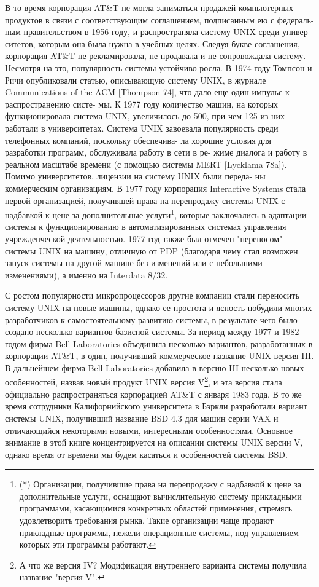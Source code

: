     В то время корпорация AT\&T не  могла  заниматься  продажей  компьютерных
продуктов  в связи с соответствующим соглашением, подписанным ею с федераль-
ным правительством в 1956 году, и распространяла систему UNIX среди  универ-
ситетов,  которым  она  была нужна в учебных целях. Следуя букве соглашения,
корпорация AT\&T не рекламировала, не продавала и  не  сопровождала  систему.
Несмотря на это, популярность системы устойчиво росла. В 1974 году Томпсон и
Ричи опубликовали статью, описывающую систему UNIX, в журнале Communications
of the ACM [Thompson 74], что дало еще один импульс к распространению систе-
мы.  К  1977 году количество машин, на которых функционировала система UNIX,
увеличилось до 500, при чем 125 из них  работали  в  университетах.  Система
UNIX завоевала популярность среди телефонных компаний, поскольку обеспечива-
ла  хорошие условия для разработки программ, обслуживала работу в сети в ре-
жиме диалога и работу в реальном масштабе времени (с  помощью  системы  MERT
[Lycklama 78a]). Помимо университетов, лицензии на систему UNIX были переда-
ны  коммерческим  организациям.  В  1977 году корпорация Interactive Systems
стала первой организацией, получившей права на перепродажу  системы  UNIX  с
надбавкой к цене за дополнительные услуги\footnote{(*) Организации, получившие права на перепродажу с надбавкой к цене  за  дополнительные  услуги, оснащают вычислительную систему прикладными программами, касающимися конкретных областей применения, стремясь  удовлетворить  требования  рынка.  Такие  организации  чаще продают прикладные программы, нежели операционные системы,  под  управлением  которых  эти программы работают.}, которые заключались в адаптации  системы к функционированию в автоматизированных системах управления учрежденческой деятельностью. 1977 год также был отмечен  "переносом"  системы UNIX на машину, отличную от PDP (благодаря чему стал возможен запуск системы на  другой  машине  без изменений или с небольшими изменениями), а именно на Interdata 8/32.

    С ростом популярности микропроцессоров другие компании стали  переносить систему  UNIX  на новые машины, однако ее простота и ясность побудили многих разработчиков к самостоятельному развитию системы, в  результате  чего  было создано  несколько  вариантов  базисной системы. За период между 1977 и 1982 годом фирма Bell Laboratories объединила несколько вариантов,  разработанных в корпорации AT\&T, в один, получивший коммерческое название UNIX версия III. В  дальнейшем  фирма Bell Laboratories добавила в версию III несколько новых особенностей, назвав новый продукт UNIX версия V\footnote{ А что же версия IV? Модификация внутреннего варианта системы получила название "версия V".}, и  эта  версия  стала официально  распространяться  корпорацией  AT\&T  с января 1983 года. В то же время сотрудники Калифорнийского университета в Бэркли  разработали  вариант системы UNIX, получивший название BSD 4.3 для машин серии VAX и отличающийся некоторыми новыми, интересными особенностями. Основное внимание в этой книге концентрируется  на  описании системы UNIX версии V, однако время от времени мы будем касаться и особенностей системы BSD.
    
